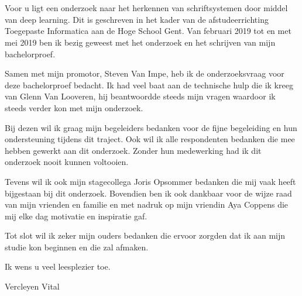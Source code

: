 
\chapter*{}
\label{ch:voorwoord}


Voor u ligt een onderzoek naar het herkennen van schriftsystemen door middel van deep learning.
Dit is geschreven in het kader van de afstudeerrichting Toegepaste Informatica aan de Hoge School Gent.
Van februari 2019 tot en met mei 2019 ben ik bezig geweest met het onderzoek en het schrijven van mijn bachelorproef.

Samen met mijn promotor, Steven Van Impe, heb ik de onderzoeksvraag voor deze bachelorproef bedacht.
Ik had veel baat aan de technische hulp die ik kreeg van Glenn Van Looveren, hij beantwoordde steeds mijn vragen waardoor ik steeds verder kon met mijn onderzoek.

Bij dezen wil ik graag mijn begeleiders bedanken voor de fijne begeleiding en hun ondersteuning tijdens dit traject. Ook wil ik alle respondenten bedanken die mee hebben gewerkt aan dit onderzoek. Zonder hun medewerking had ik dit onderzoek nooit kunnen voltooien.

Tevens wil ik ook mijn stagecollega Joris Opsommer bedanken die mij vaak heeft bijgestaan bij dit onderzoek.
Bovendien ben ik ook dankbaar voor de wijze raad van mijn vrienden en familie en met nadruk op mijn vriendin Aya Coppens die mij elke dag motivatie en inspiratie gaf.

Tot slot wil ik zeker mijn ouders bedanken die ervoor zorgden dat ik aan mijn studie kon beginnen en die zal afmaken.

Ik wens u veel leesplezier toe.

Vercleyen Vital

